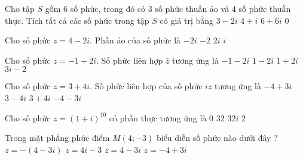 \begin{ex}%
Cho tập $S$ gồm $6$ số phức, trong đó có $3$ số phức thuần ảo và $4$ số phức thuần thực. Tích tất cả các số phức trong tập $S$ có giá trị bằng
\choice
{$3-2 i$}
{$4+i$}
{$6+6 i$}
{\True$0$}
\end{ex}

\begin{ex}%
Cho số phức $z=4-2 i$. Phần ảo của số phức là
\choice
{$-2 i$}
{\True $-2$}
{$2 i$}
{$i$}
\end{ex}

\begin{ex}%
Cho số phức $z=-1+2 i$. Số phức liên hợp $\bar{z}$ tương ứng là
\choice
{\True $-1-2 i$}
{$1-2 i$}
{$1+2 i$}
{$3 i-2$}
\end{ex}

\begin{ex}%
Cho số phức $z=3+4 i$. Số phức liên hợp của số phức $i z$ tương ứng là
\choice
{$-4+3 i$}
{$3-4 i$}
{$3+4 i$}
{\True $-4-3 i$}
\end{ex}

\begin{ex}%
Cho số phức $z=(1+i)^{10}$ có phần thực tương ứng là
\choice
{\True $0$}
{$32$}
{$32i$}
{$2$}
\end{ex}

\begin{ex}%
Trong mặt phẳng phức điểm $M(4 ;-3)$ biểu diễn số phức nào dưới đây ?
\choice
{$z=-(4-3 i)$}
{$z=4 i-3$}
{\True$z=4-3 i$}
{$z=-4+3 i$}
\end{ex}

